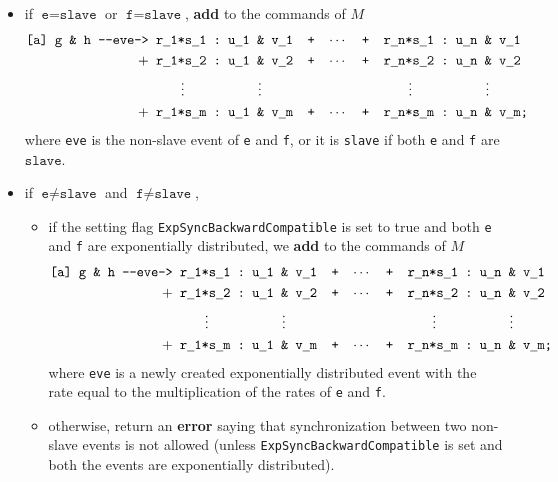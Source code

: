\documentclass{article}
\newcommand{\arci}[1]{{-}{-}{#1}->}
\renewcommand{\_}{\underline{~}}
\newcommand{\code}[1]{\texttt{#1}}
\begin{document}
\begin{enumerate}
\begin{itemize}
		\item if $\code{e} = \code{slave}$ or  $\code{f} = \code{slave}$, \textbf{add} to the commands of $M$ 
		\begin{align*}
			\code{[a] g \&  h \arci{eve}} 
			  & \code{ r\_1*s\_1\ :\ u\_1 \& v\_1 ~+~ $\cdots$ ~+~ r\_n*s\_1\ :\ u\_n \& v\_1 }\\
			+ & \code{ r\_1*s\_2\ :\ u\_1 \& v\_2 ~+~ $\cdots$ ~+~ r\_n*s\_2\ :\ u\_n \& v\_2 }\\
              & ~~~~~~~ \vdots ~~~~~~~~~~~~~~~~ \vdots ~~~~~~~~~~~~~~~~~~~~~~~~~~~~~~~~ \vdots ~~~~~~~~~~~~~~~~ \vdots \\
			+ & \code{ r\_1*s\_m\ :\ u\_1 \& v\_m ~+~ $\cdots$ ~+~ r\_n*s\_m\ :\ u\_n \& v\_m;}\\
		\end{align*}
		where \code{eve} is the non-slave event of \code{e} and \code{f}, or it is \code{slave} if both \code{e} and \code{f} are $\code{slave}$.
		\item if $\code{e} \neq \code{slave}$ and $\code{f} \neq \code{slave}$, 
		\begin{itemize}
			\item if the setting flag \code{ExpSyncBackwardCompatible} is set to true and both \code{e} and \code{f} are exponentially distributed, we \textbf{add} to the commands of $M$ 
			\begin{align*}
			   \code{[a] g \&  h \arci{eve}} 
			     & \code{ r\_1*s\_1\ :\ u\_1 \& v\_1 ~+~ $\cdots$ ~+~ r\_n*s\_1\ :\ u\_n \& v\_1 }\\
			   + & \code{ r\_1*s\_2\ :\ u\_1 \& v\_2 ~+~ $\cdots$ ~+~ r\_n*s\_2\ :\ u\_n \& v\_2 }\\
			     & ~~~~~~~ \vdots ~~~~~~~~~~~~~~~~ \vdots ~~~~~~~~~~~~~~~~~~~~~~~~~~~~~~~~ \vdots ~~~~~~~~~~~~~~~~ \vdots \\
			   + & \code{ r\_1*s\_m\ :\ u\_1 \& v\_m ~+~ $\cdots$ ~+~ r\_n*s\_m\ :\ u\_n \& v\_m;}\\
			\end{align*}
			where \code{eve} is a newly created exponentially distributed event with the rate equal to the multiplication of the rates of \code{e} and \code{f}.
			
			
			\item otherwise, return an \textbf{error} saying that synchronization between two non-slave events is not allowed (unless \code{ExpSyncBackwardCompatible} is set and both the events are exponentially distributed).
		\end{itemize} 
	\end{itemize}
\end{enumerate}
\end{document}
